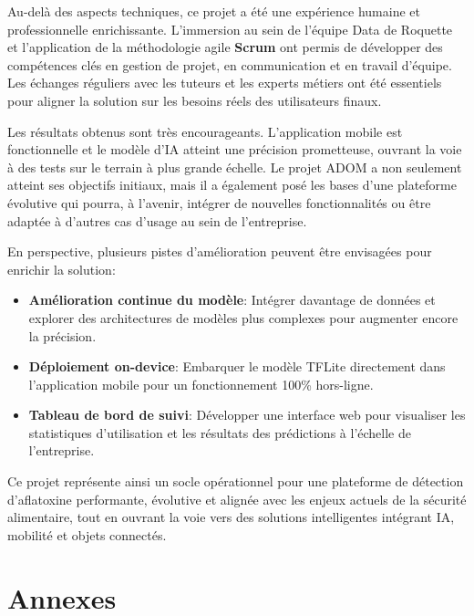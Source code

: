 \documentclass[12pt,a4paper]{report}
\begin{document}
\medskip
\noindent
Au-delà des aspects techniques, ce projet a été une expérience humaine et professionnelle enrichissante. L’immersion au sein de l’équipe Data de Roquette et l’application de la méthodologie agile \textbf{Scrum} ont permis de développer des compétences clés en gestion de projet, en communication et en travail d’équipe. Les échanges réguliers avec les tuteurs et les experts métiers ont été essentiels pour aligner la solution sur les besoins réels des utilisateurs finaux.

\medskip
\noindent
Les résultats obtenus sont très encourageants. L’application mobile est fonctionnelle et le modèle d’IA atteint une précision prometteuse, ouvrant la voie à des tests sur le terrain à plus grande échelle. Le projet ADOM a non seulement atteint ses objectifs initiaux, mais il a également posé les bases d’une plateforme évolutive qui pourra, à l’avenir, intégrer de nouvelles fonctionnalités ou être adaptée à d’autres cas d’usage au sein de l’entreprise.

\medskip
\noindent
En perspective, plusieurs pistes d’amélioration peuvent être envisagées pour enrichir la solution:
\begin{itemize}
    \item \textbf{Amélioration continue du modèle}: Intégrer davantage de données et explorer des architectures de modèles plus complexes pour augmenter encore la précision.
    \item \textbf{Déploiement on-device}: Embarquer le modèle TFLite directement dans l’application mobile pour un fonctionnement 100\% hors-ligne.
    \item \textbf{Tableau de bord de suivi}: Développer une interface web pour visualiser les statistiques d’utilisation et les résultats des prédictions à l’échelle de l’entreprise.
\end{itemize}

\medskip
\noindent
Ce projet représente ainsi un socle opérationnel pour une plateforme de détection d’aflatoxine performante, évolutive et alignée avec les enjeux actuels de la sécurité alimentaire, tout en ouvrant la voie vers des solutions intelligentes intégrant IA, mobilité et objets connectés.

\appendix
\chapter*{Annexes}
\end{document}
